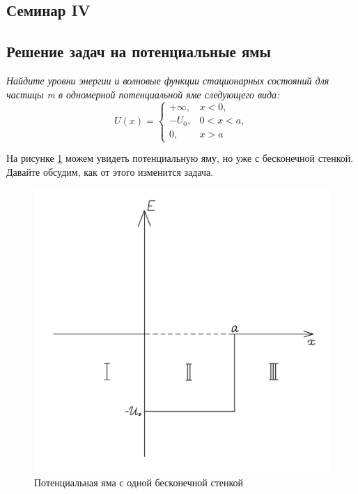 \begin{center}
    \section{Семинар IV}
\end{center}
\subsection{Решение задач на потенциальные ямы}
\begin{center}
    \textit{Найдите уровни энергии и волновые функции стационарных состояний для частицы m в одномерной потенциальной яме следующего вида:}
    \[
    U(x) =
    \begin{cases}
    +\infty,& x<0,\\
    -U_0,& 0<x<a,\\
    0,& x>a
    \end{cases}
    \]
\end{center}

На рисунке \ref{fig 4.1} можем увидеть потенциальную яму, но уже с бесконечной стенкой. Давайте обсудим, как от этого изменится задача.
\begin{figure}[!ht]
\centering
\includegraphics[scale=0.27]{class_4/images/half-inf hole.png}
\caption{Потенциальная яма с одной бесконечной стенкой}
\label{fig 4.1}
\end{figure}

